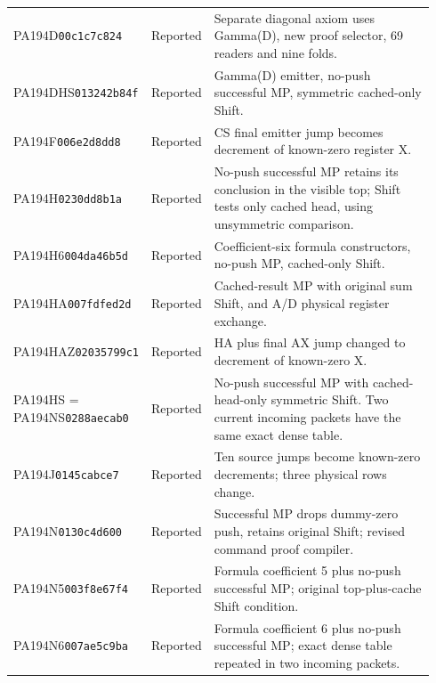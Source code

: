 \begin{longtable}{@{}p{0.245\linewidth}p{0.14\linewidth}p{0.55\linewidth}@{}}
PA194D\newline\texttt{00c1c7c824} & Reported & Separate diagonal axiom uses Gamma(D), new proof selector, 69 readers and nine folds. \\[2pt]
PA194DHS\newline\texttt{013242b84f} & Reported & Gamma(D) emitter, no-push successful MP, symmetric cached-only Shift. \\[2pt]
PA194F\newline\texttt{006e2d8dd8} & Reported & CS final emitter jump becomes decrement of known-zero register X. \\[2pt]
PA194H\newline\texttt{0230dd8b1a} & Reported & No-push successful MP retains its conclusion in the visible top; Shift tests only cached head, using unsymmetric comparison. \\[2pt]
PA194H6\newline\texttt{004da46b5d} & Reported & Coefficient-six formula constructors, no-push MP, cached-only Shift. \\[2pt]
PA194HA\newline\texttt{007fdfed2d} & Reported & Cached-result MP with original sum Shift, and A/D physical register exchange. \\[2pt]
PA194HAZ\newline\texttt{02035799c1} & Reported & HA plus final AX jump changed to decrement of known-zero X. \\[2pt]
PA194HS = PA194NS\newline\texttt{0288aecab0} & Reported & No-push successful MP with cached-head-only symmetric Shift. Two current incoming packets have the same exact dense table. \\[2pt]
PA194J\newline\texttt{0145cabce7} & Reported & Ten source jumps become known-zero decrements; three physical rows change. \\[2pt]
PA194N\newline\texttt{0130c4d600} & Reported & Successful MP drops dummy-zero push, retains original Shift; revised command proof compiler. \\[2pt]
PA194N5\newline\texttt{003f8e67f4} & Reported & Formula coefficient 5 plus no-push successful MP; original top-plus-cache Shift condition. \\[2pt]
PA194N6\newline\texttt{007ae5c9ba} & Reported & Formula coefficient 6 plus no-push successful MP; exact dense table repeated in two incoming packets. \\[2pt]

\end{longtable}
